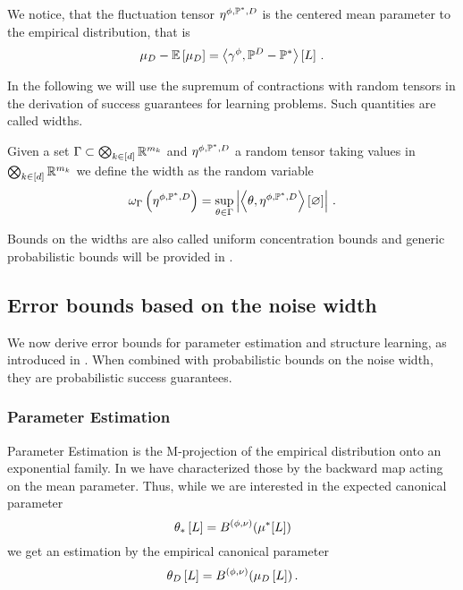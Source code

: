 We notice, that the fluctuation tensor $\eta^{\phi,\mathbb{P}^*,D}$ is the centered mean parameter to the empirical distribution, that is
\begin{align*}
    \mu_{D} - \mathbb{E}\left[\mu_{D}\right] =  \left\langle \gamma^{\phi},\mathbb{P}^{D}-\mathbb{P}^*\right\rangle \left[ L \right] \, .
\end{align*}

In the following we will use the supremum of contractions with random tensors in the derivation of success guarantees for learning problems.
Such quantities are called widths.

\begin{definition}
    \label{def:width}
    Given a set $\Gamma\subset\bigotimes_{k\in[d]} \mathbb{R}^{m_{k}}$ and $\eta^{\phi,\mathbb{P}^*,D}$ a random tensor taking values in $\bigotimes_{k\in[d]} \mathbb{R}^{m_{k}}$ we define the width as the random variable
    \[ \omega_{\Gamma}\left(\eta^{\phi,\mathbb{P}^*,D}\right) = \sup_{\theta\in\Gamma} \left|\left\langle \theta,\eta^{\phi,\mathbb{P}^*,D}\right\rangle \left[ \varnothing \right]\right| \, . \]
\end{definition}

Bounds on the widths are also called uniform concentration bounds \cite{goesmann_uniform_2021} and generic probabilistic bounds will be provided in .

\subsection{Error bounds based on the noise width}

We now derive error bounds for parameter estimation and structure learning, as introduced in .
When combined with probabilistic bounds on the noise width, they are probabilistic success guarantees.

\subsubsection{Parameter Estimation}


Parameter Estimation is the M-projection of the empirical distribution onto an exponential family.
In  we have characterized those by the backward map acting on the mean parameter.
Thus, while we are interested in the expected canonical parameter
\[
    \theta_{*}\left[L\right] = B^{(\phi,\nu)}(\mu^*[L])
\]
we get an estimation by the empirical canonical parameter
\[
    \theta_{D}\left[L\right]  = B^{(\phi,\nu)}(\mu_{D}\left[L\right]) \, .
\]

